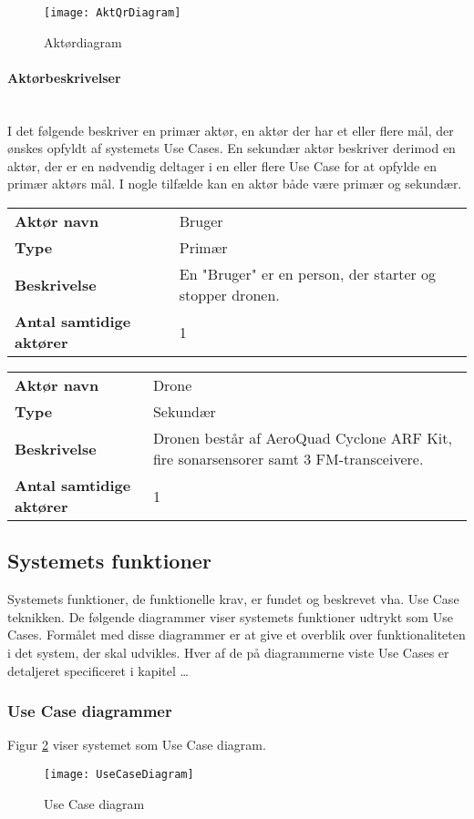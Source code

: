 \documentclass[Main]{subfiles}
\begin{document}
\begin{figure}[hbtp]
\centering
\texttt{[image: AktQrDiagram]}
\caption{Aktørdiagram}
\label{Fig:Aktor-oversigt}
\end{figure}


\paragraph{Aktørbeskrivelser}\mbox{} \\%
I det følgende beskriver en primær aktør, en aktør der har et eller flere mål, der ønskes opfyldt af systemets Use Cases. 
En sekundær aktør beskriver derimod en aktør, der er en nødvendig deltager i en eller flere Use Case for at opfylde en primær aktørs mål. 
I nogle tilfælde kan en  aktør både være primær og sekundær.

\begin{longtable}{p{}|p{}}
\hline
\textbf{Aktør navn}  				& Bruger \\
\textbf{Type} 						& Primær \\
\textbf{Beskrivelse} 				& En "Bruger" er en person, der starter og stopper dronen. \\
\textbf{Antal samtidige aktører} 	& 1 \\
\hline
\end{longtable}

\begin{longtable}{p{}|p{}}
\hline
\textbf{Aktør navn}  				& Drone \\
\textbf{Type} 						& Sekundær \\
\textbf{Beskrivelse} 				& Dronen består af AeroQuad Cyclone ARF Kit, fire sonarsensorer samt 3 FM-transceivere. \\
\textbf{Antal samtidige aktører} 	& 1 \\
\hline
\end{longtable}


\subsection{Systemets funktioner}
Systemets funktioner, de funktionelle krav, er fundet og beskrevet vha. Use Case teknikken. 
De følgende diagrammer viser systemets funktioner udtrykt som Use Cases. 
Formålet med disse diagrammer er at give et overblik over funktionaliteten i det system, der skal udvikles. 
Hver af de på diagrammerne viste Use Cases er detaljeret specificeret i kapitel \dots %



\subsubsection{Use Case diagrammer}
Figur \ref{Fig:UC-Diagram} viser systemet som Use Case diagram.

\begin{figure}[hbtp]
\centering
\texttt{[image: UseCaseDiagram]}
\caption{Use Case diagram}
\label{Fig:UC-Diagram}
\end{figure}
\end{document}
